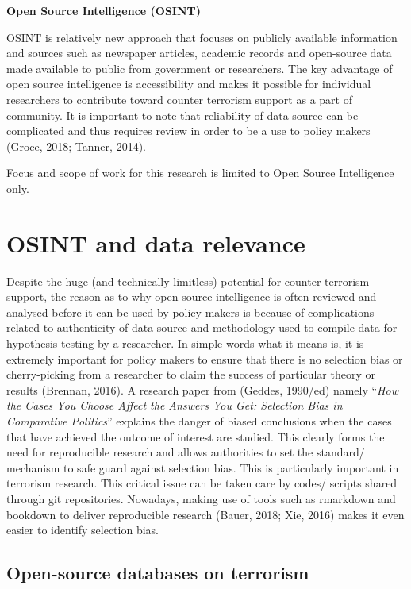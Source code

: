 \documentclass[11pt,oneside,a4paper]{reedthesis}
\begin{document}
\textbf{Open Source Intelligence (OSINT)}

OSINT is relatively new approach that focuses on publicly available
information and sources such as newspaper articles, academic records and
open-source data made available to public from government or
researchers. The key advantage of open source intelligence is
accessibility and makes it possible for individual researchers to
contribute toward counter terrorism support as a part of community. It
is important to note that reliability of data source can be complicated
and thus requires review in order to be a use to policy makers (Groce,
2018; Tanner, 2014).

Focus and scope of work for this research is limited to Open Source
Intelligence only.

\section{OSINT and data relevance}\label{osint-and-data-relevance}

Despite the huge (and technically limitless) potential for counter
terrorism support, the reason as to why open source intelligence is
often reviewed and analysed before it can be used by policy makers is
because of complications related to authenticity of data source and
methodology used to compile data for hypothesis testing by a researcher.
In simple words what it means is, it is extremely important for policy
makers to ensure that there is no selection bias or cherry-picking from
a researcher to claim the success of particular theory or results
(Brennan, 2016). A research paper from (Geddes, 1990/ed) namely
``\emph{How the Cases You Choose Affect the Answers You Get: Selection
Bias in Comparative Politics}'' explains the danger of biased
conclusions when the cases that have achieved the outcome of interest
are studied. This clearly forms the need for reproducible research and
allows authorities to set the standard/ mechanism to safe guard against
selection bias. This is particularly important in terrorism research.
This critical issue can be taken care by codes/ scripts shared through
git repositories. Nowadays, making use of tools such as rmarkdown and
bookdown to deliver reproducible research (Bauer, 2018; Xie, 2016) makes
it even easier to identify selection bias.

\subsection{Open-source databases on
terrorism}\label{open-source-databases-on-terrorism}
\end{document}
